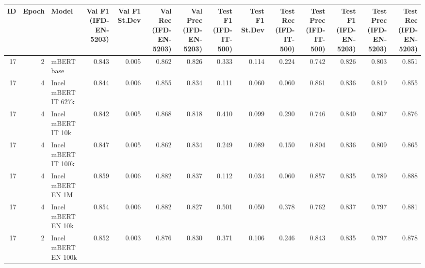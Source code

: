 \begin{tabular}{rrlrrrrrrrrrrr}
\toprule
 ID &  Epoch &               Model &  Val F1 (IFD-EN-5203) &  Val F1 St.Dev &  Val Rec (IFD-EN-5203) &  Val Prec (IFD-EN-5203) &  Test F1 (IFD-IT-500) &  Test F1 St.Dev &  Test Rec (IFD-IT-500) &  Test Prec (IFD-IT-500) &  Test F1 (IFD-EN-5203) &  Test Prec (IFD-EN-5203) &  Test Rec (IFD-EN-5203) \\
\midrule
 17 &      2 &          mBERT base &                 0.843 &          0.005 &                  0.862 &                   0.826 &                 0.333 &           0.114 &                  0.224 &                   0.742 &                  0.826 &                    0.803 &                   0.851 \\
 17 &      4 & Incel mBERT IT 627k &                 0.844 &          0.006 &                  0.855 &                   0.834 &                 0.111 &           0.060 &                  0.060 &                   0.861 &                  0.836 &                    0.819 &                   0.855 \\
 17 &      4 &  Incel mBERT IT 10k &                 0.842 &          0.005 &                  0.868 &                   0.818 &                 0.410 &           0.099 &                  0.290 &                   0.746 &                  0.840 &                    0.807 &                   0.876 \\
 17 &      4 & Incel mBERT IT 100k &                 0.847 &          0.005 &                  0.862 &                   0.834 &                 0.249 &           0.089 &                  0.150 &                   0.804 &                  0.836 &                    0.809 &                   0.865 \\
 17 &      4 &   Incel mBERT EN 1M &                 0.859 &          0.006 &                  0.882 &                   0.837 &                 0.112 &           0.034 &                  0.060 &                   0.857 &                  0.835 &                    0.789 &                   0.888 \\
 17 &      4 &  Incel mBERT EN 10k &                 0.854 &          0.006 &                  0.882 &                   0.827 &                 0.501 &           0.050 &                  0.378 &                   0.762 &                  0.837 &                    0.797 &                   0.881 \\
 17 &      2 & Incel mBERT EN 100k &                 0.852 &          0.003 &                  0.876 &                   0.830 &                 0.371 &           0.106 &                  0.246 &                   0.843 &                  0.835 &                    0.797 &                   0.878 \\

\end{tabular}
